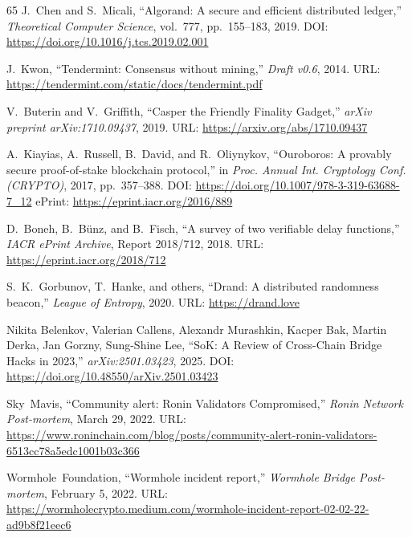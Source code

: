\documentclass[journal]{IEEEtran}
\begin{document}
\begin{thebibliography}{65}
J.~Chen and S.~Micali,
``Algorand: A secure and efficient distributed ledger,''
\textit{Theoretical Computer Science}, vol.~777, pp.~155--183, 2019.
\newblock DOI: \url{https://doi.org/10.1016/j.tcs.2019.02.001}

J.~Kwon,
``Tendermint: Consensus without mining,''
\textit{Draft v0.6}, 2014.
\newblock URL: \url{https://tendermint.com/static/docs/tendermint.pdf}

V.~Buterin and V.~Griffith,
``Casper the Friendly Finality Gadget,''
\textit{arXiv preprint arXiv:1710.09437}, 2019.
\newblock URL: \url{https://arxiv.org/abs/1710.09437}

A.~Kiayias, A.~Russell, B.~David, and R.~Oliynykov,
``Ouroboros: A provably secure proof-of-stake blockchain protocol,''
in \textit{Proc. Annual Int. Cryptology Conf. (CRYPTO)}, 2017,
pp.~357--388.
\newblock DOI: \url{https://doi.org/10.1007/978-3-319-63688-7_12}
\newblock ePrint: \url{https://eprint.iacr.org/2016/889}


D.~Boneh, B.~B\"unz, and B.~Fisch,
``A survey of two verifiable delay functions,''
\textit{IACR ePrint Archive}, Report 2018/712, 2018.
\newblock URL: \url{https://eprint.iacr.org/2018/712}

S.~K.~Gorbunov, T.~Hanke, and others,
``Drand: A distributed randomness beacon,''
\textit{League of Entropy}, 2020.
\newblock URL: \url{https://drand.love}


Nikita Belenkov, Valerian Callens, Alexandr Murashkin, Kacper Bak, Martin Derka, Jan Gorzny, Sung-Shine Lee,
``SoK: A Review of Cross-Chain Bridge Hacks in 2023,''
\textit{arXiv:2501.03423}, 2025.
\newblock DOI: \url{https://doi.org/10.48550/arXiv.2501.03423}

Sky~Mavis,
``Community alert: Ronin Validators Compromised,''
\textit{Ronin Network Post-mortem}, March 29, 2022.
\newblock URL: \url{https://www.roninchain.com/blog/posts/community-alert-ronin-validators-6513cc78a5edc1001b03c366}

Wormhole~Foundation,
``Wormhole incident report,''
\textit{Wormhole Bridge Post-mortem}, February 5, 2022.
\newblock URL: \url{https://wormholecrypto.medium.com/wormhole-incident-report-02-02-22-ad9b8f21eec6}

\end{thebibliography}
\end{document}

